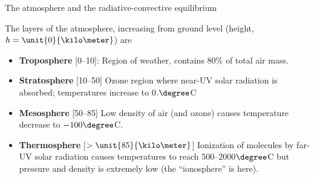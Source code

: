 \documentclass[12pt]{article}
\begin{document}
\begin{center}
{\Large The atmosphere and the radiative-convective equilibrium}
\end{center}

\noindent The layers of the atmosphere, increasing from ground level (height, $h = \unit{0}{\kilo\meter}$) are
	\begin{itemize}
	\item {\bf Troposphere} [0--\unit{10}{\kilo\meter}]: Region of weather, contains 80\% of total air mass.
	\item {\bf Stratosphere} [10--\unit{50}{\kilo\meter}] Ozone region where near-UV solar radiation is absorbed; temperatures increase to 0$.\degree$C
	\item {\bf Mesosphere} [50--\unit{85}{\kilo\meter}] Low density of air (and ozone) causes temperature decrease to $-100\degree$C.
	\item {\bf Thermosphere} [$>\unit{85}{\kilo\meter}$] Ionization of molecules by far-UV solar radiation causes temperatures to reach 500--2000$\degree$C but pressure and density is extremely low (the ``ionosphere'' is here).
	\end{itemize}

%
\end{document}
